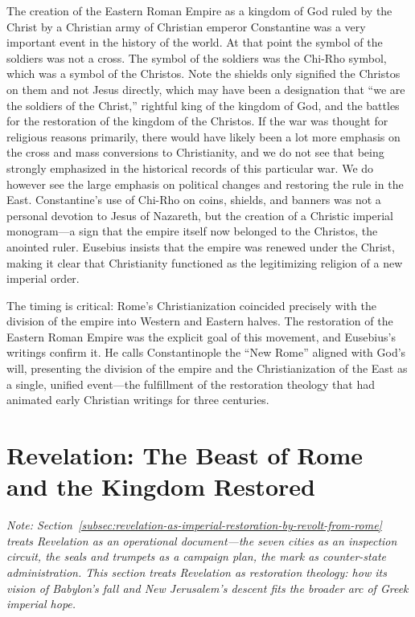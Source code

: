 The creation of the Eastern Roman Empire as a kingdom of God ruled by the Christ by a Christian army of Christian emperor Constantine was a very important event in the history of the world.
At that point the symbol of the soldiers was not a cross.
The symbol of the soldiers was the Chi-Rho symbol, which was a symbol of the Christos.
Note the shields only signified the Christos on them and not Jesus directly, which may have been a designation that ``we are the soldiers of the Christ,'' rightful king of the kingdom of God, and the battles for the restoration of the kingdom of the Christos.
If the war was thought for religious reasons primarily, there would have likely been a lot more emphasis on the cross and mass conversions to Christianity, and we do not see that being strongly emphasized in the historical records of this particular war.
We do however see the large emphasis on political changes and restoring the rule in the East.
Constantine's use of Chi-Rho on coins, shields, and banners was not a personal devotion to Jesus of Nazareth, but the creation of a Christic imperial monogram---a sign that the empire itself now belonged to the Christos, the anointed ruler.
Eusebius \cite[Book 1]{eusebius:vita} insists that the empire was renewed under the Christ, making it clear that Christianity functioned as the legitimizing religion of a new imperial order.

The timing is critical: Rome's Christianization coincided precisely with the division of the empire into Western and Eastern halves.
The restoration of the Eastern Roman Empire was the explicit goal of this movement, and Eusebius's writings confirm it.
He calls Constantinople the ``New Rome'' aligned with God's will, presenting the division of the empire and the Christianization of the East as a single, unified event---the fulfillment of the restoration theology that had animated early Christian writings for three centuries.

\section{Revelation: The Beast of Rome and the Kingdom Restored}\label{sec:revelation-political-restoration}

\emph{Note: Section~\ref{subsec:revelation-as-imperial-restoration-by-revolt-from-rome} treats Revelation as an operational document---the seven cities as an inspection circuit, the seals and trumpets as a campaign plan, the mark as counter-state administration.
This section treats Revelation as restoration theology: how its vision of Babylon's fall and New Jerusalem's descent fits the broader arc of Greek imperial hope.}

